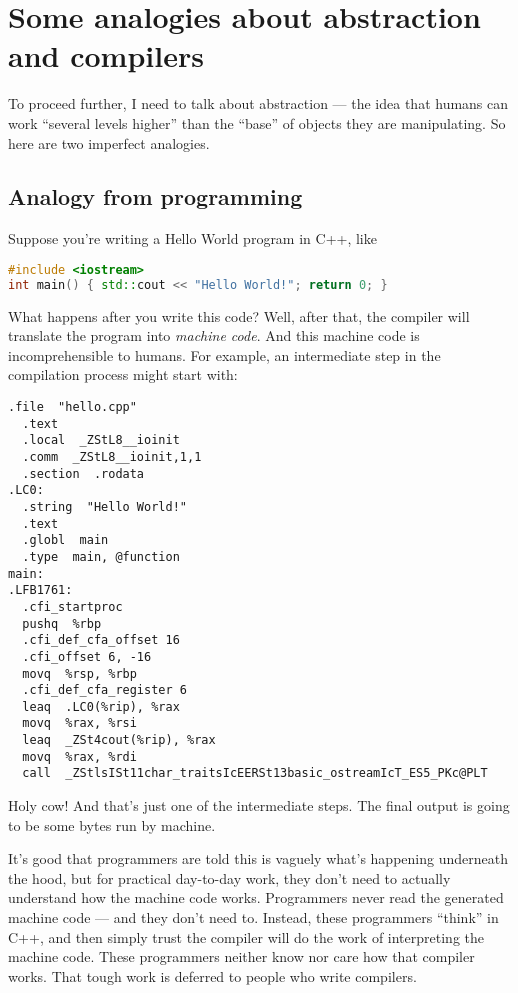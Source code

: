 \documentclass[11pt]{scrartcl}
\begin{document}
\section{Some analogies about abstraction and compilers}
\label{sec:analogy}

To proceed further, I need to talk about abstraction ---
the idea that humans can work ``several levels higher''
than the ``base'' of objects they are manipulating.
So here are two imperfect analogies.

\subsection{Analogy from programming}
Suppose you're writing a Hello World program in C++, like
\begin{lstlisting}[language=C++,basicstyle=\scriptsize\ttfamily]
#include <iostream>
int main() { std::cout << "Hello World!"; return 0; }
\end{lstlisting}
What happens after you write this code?
Well, after that, the compiler will translate the
program into \emph{machine code}.
And this machine code is incomprehensible to humans.
For example, an intermediate step in the compilation process might start with:
\begin{lstlisting}[basicstyle=\tiny\ttfamily,numbers=none]
  .file  "hello.cpp"
  .text
  .local  _ZStL8__ioinit
  .comm  _ZStL8__ioinit,1,1
  .section  .rodata
.LC0:
  .string  "Hello World!"
  .text
  .globl  main
  .type  main, @function
main:
.LFB1761:
  .cfi_startproc
  pushq  %rbp
  .cfi_def_cfa_offset 16
  .cfi_offset 6, -16
  movq  %rsp, %rbp
  .cfi_def_cfa_register 6
  leaq  .LC0(%rip), %rax
  movq  %rax, %rsi
  leaq  _ZSt4cout(%rip), %rax
  movq  %rax, %rdi
  call  _ZStlsISt11char_traitsIcEERSt13basic_ostreamIcT_ES5_PKc@PLT
\end{lstlisting}
Holy cow! And that's just one of the intermediate steps.
The final output is going to be some bytes run by machine.

It's good that programmers are told this is vaguely what's happening
underneath the hood, but for practical day-to-day work,
they don't need to actually understand how the machine code works.
Programmers never read the generated machine code --- and they don't need to.
\alert{Instead, these programmers ``think'' in C++, and then simply trust
the compiler will do the work of interpreting the machine code.}
These programmers neither know nor care how that compiler works.
That tough work is deferred to people who write compilers.
\end{document}
